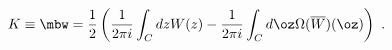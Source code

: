 \begin{equation}\label{K}
K\equiv \mbw=\frac{1}{2}\left(\frac{1}{2\pi i}\int_C
dz W(z)-\frac{1}{2\pi i}\int_C d\oz \Omega 
(\overline{W})(\oz)\right) \ . 
\end{equation}

